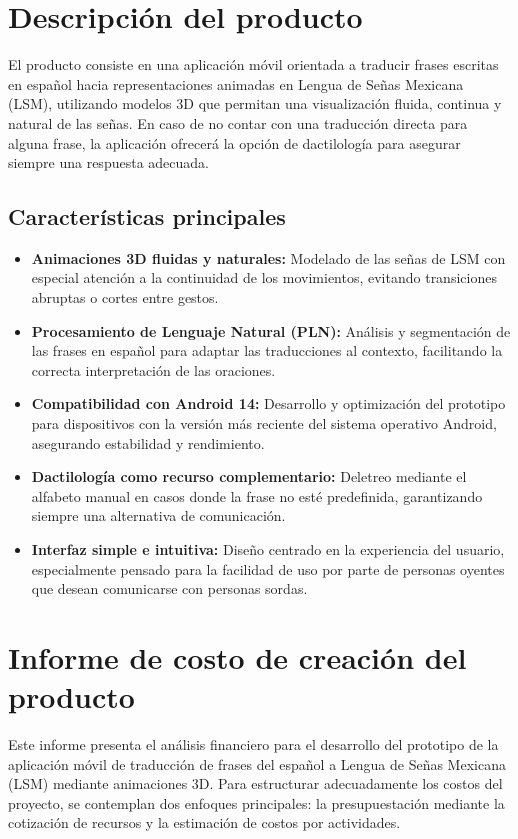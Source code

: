 \section{Descripción del producto}
El producto consiste en una aplicación móvil orientada a traducir frases escritas en español hacia representaciones animadas en Lengua de Señas Mexicana (LSM), utilizando modelos 3D que permitan una visualización fluida, continua y natural de las señas. En caso de no contar con una traducción directa para alguna frase, la aplicación ofrecerá la opción de dactilología para asegurar siempre una respuesta adecuada.

\subsection{Características principales}
\begin{itemize}
	\item \textbf{Animaciones 3D fluidas y naturales:} Modelado de las señas de LSM con especial atención a la continuidad de los movimientos, evitando transiciones abruptas o cortes entre gestos.
	\item \textbf{Procesamiento de Lenguaje Natural (PLN):} Análisis y segmentación de las frases en español para adaptar las traducciones al contexto, facilitando la correcta interpretación de las oraciones.
	\item \textbf{Compatibilidad con Android 14:} Desarrollo y optimización del prototipo para dispositivos con la versión más reciente del sistema operativo Android, asegurando estabilidad y rendimiento.
	\item \textbf{Dactilología como recurso complementario:} Deletreo mediante el alfabeto manual en casos donde la frase no esté predefinida, garantizando siempre una alternativa de comunicación.
	\item \textbf{Interfaz simple e intuitiva:} Diseño centrado en la experiencia del usuario, especialmente pensado para la facilidad de uso por parte de personas oyentes que desean comunicarse con personas sordas.
\end{itemize}

\newpage

\section*{Informe de costo de creación del producto}

Este informe presenta el análisis financiero para el desarrollo del prototipo de la aplicación móvil de traducción de frases del español a Lengua de Señas Mexicana (LSM) mediante animaciones 3D. Para estructurar adecuadamente los costos del proyecto, se contemplan dos enfoques principales: la presupuestación mediante la cotización de recursos y la estimación de costos por actividades.

